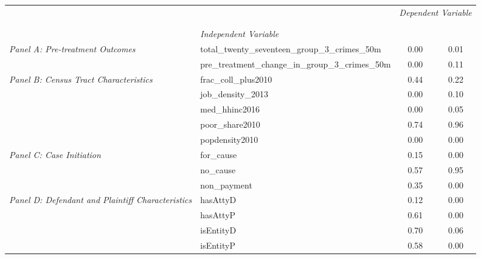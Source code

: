 \begin{tabular}{llcc}
\toprule
 &  & \multicolumn{2}{c}{\textit{Dependent Variable}} \\
\cline{3-4}
\\
 &  &  &  \\
 & \emph{Independent Variable} &  &  \\
\midrule
\multirow[c]{2}{3cm}{\textit{Panel A: Pre-treatment Outcomes}} & total_twenty_seventeen_group_3_crimes_50m & 0.00 & 0.01 \\
 & pre_treatment_change_in_group_3_crimes_50m & 0.00 & 0.11 \\
\cline{1-4}
\multirow[c]{5}{3cm}{\textit{Panel B: Census Tract Characteristics}} & frac_coll_plus2010 & 0.44 & 0.22 \\
 & job_density_2013 & 0.00 & 0.10 \\
 & med_hhinc2016 & 0.00 & 0.05 \\
 & poor_share2010 & 0.74 & 0.96 \\
 & popdensity2010 & 0.00 & 0.00 \\
\cline{1-4}
\multirow[c]{3}{3cm}{\textit{Panel C: Case Initiation}} & for_cause & 0.15 & 0.00 \\
 & no_cause & 0.57 & 0.95 \\
 & non_payment & 0.35 & 0.00 \\
\cline{1-4}
\multirow[c]{4}{3cm}{\textit{Panel D: Defendant and Plaintiff Characteristics}} & hasAttyD & 0.12 & 0.00 \\
 & hasAttyP & 0.61 & 0.00 \\
 & isEntityD & 0.70 & 0.06 \\
 & isEntityP & 0.58 & 0.00 \\
\cline{1-4}
\bottomrule
\end{tabular}
